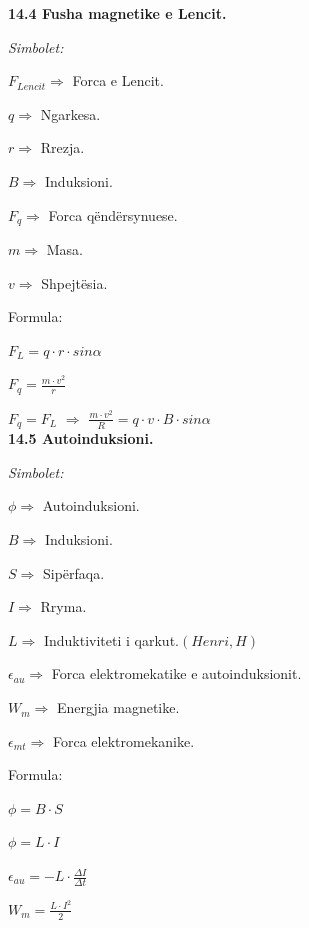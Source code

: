 \documentclass[twocolumn]{article}
\begin{document}
	\textbf{14.4 Fusha magnetike e Lencit.}
	
	\begin{center}
		\textit{Simbolet:}
	\end{center}
	
	$F_{Lencit} \Rightarrow $ Forca e Lencit.
	
	$q \Rightarrow $ Ngarkesa.
	
	$r \Rightarrow $ Rrezja.
	
	$B \Rightarrow $ Induksioni.
	
	$F_{q} \Rightarrow$  Forca qëndërsynuese.
	
	$m \Rightarrow $ Masa.
	
	$v \Rightarrow$ Shpejtësia.
	
	\begin{center}
		Formula:
	\end{center}
	
	$F_L=q  \cdot r \cdot sin\alpha$
	
	$F_q=\frac{m \cdot v^2}{r}$
	
	$F_q=F_L$ $\Rightarrow$ $\frac{m \cdot v^2}{R}=q \cdot v \cdot B \cdot sin\alpha$\\
	
	\textbf{14.5 Autoinduksioni. }
	
	\begin{center}
		\textit{Simbolet:}
	\end{center}
	
	$\phi \Rightarrow$ Autoinduksioni.
	
	$B \Rightarrow $ Induksioni.
	
	$S \Rightarrow $ Sipërfaqa.
	
	$I \Rightarrow $ Rryma.
	
	$L \Rightarrow$ Induktiviteti i qarkut.$(Henri,H)$
	
	$\epsilon_{au} \Rightarrow $ Forca elektromekatike e autoinduksionit.
	
	$W_m \Rightarrow $ Energjia magnetike.
	
	$\epsilon_{mt} \Rightarrow $ Forca elektromekanike.
	
	\begin{center}
		Formula:
	\end{center}
	
	$\phi =B \cdot S$
	
	
	$\phi =L \cdot I$
	
	
	$\epsilon_{au}=-L \cdot \frac{\Delta I}{\Delta t}$
	
	$W_m=\frac{L \cdot I^2}{2}$
	
\end{document}
